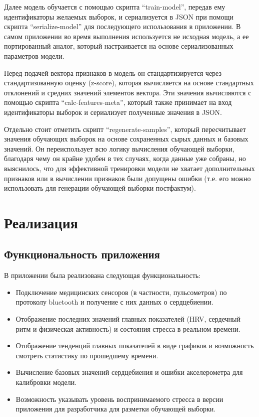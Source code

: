 \documentclass[14pt]{matmex-diploma-custom}
\begin{document}
Далее модель обучается с помощью скрипта ``train-model'', передав ему
идентификаторы желаемых выборок, и сериализуется в JSON при помощи скрипта
``serialize-model'' для последующего использования в приложении. В самом
приложении во время выполнения используется не исходная модель, а ее
портированный аналог, который настраивается на основе сериализованных параметров
модели.

Перед подачей вектора признаков в модель он стандартизируется через
стандартизованную оценку (z-score), которая вычисляется на основе стандартных
отклонений и средних значений элементов вектора. Эти значения вычисляются с
помощью скрипта ``calc-features-meta'', который также принимает на вход
идентификаторы выборок и сериализует полученные значения в JSON.

Отдельно стоит отметить скрипт ``regenerate-samples'', который пересчитывает
значения обучающих выборок на основе сохраненных сырых данных и базовых
значений. Он переиспользует всю логику вычисления обучающей выборки, благодаря
чему он крайне удобен в тех случаях, когда данные уже собраны, но выяснилось,
что для эффективной тренировки модели не хватает дополнительных признаков или в
вычислении признаков были допущены ошибки (т.е. его можно использовать для
генерации обучающей выборки постфактум).

\section{Реализация}
\subsection{Функциональность приложения}
В приложении была реализована следующая функциональность:
\begin{itemize}
\item Подключение медицинских сенсоров (в частности, пульсометров) по протоколу
  bluetooth и получение с них данных о сердцебиении.
\item Отображение последних значений главных показателей (HRV, сердечный ритм и
  физическая активность) и состояния стресса в реальном времени.
\item Отображение тенденций главных показателей в виде графиков и возможность
  смотреть статистику по прошедшему времени.
\item Вычисление базовых значений сердцебиения и ошибки акселерометра для калибровки модели.
\item Возможность указывать уровень воспринимаемого стресса в версии приложения
  для разработчика для разметки обучающей выборки.
\end{itemize}
\end{document}
